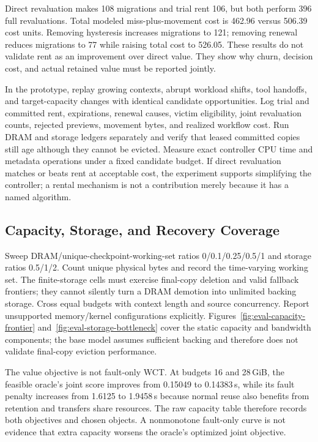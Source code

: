 \documentclass[sigplan,10pt,anonymous,nonacm]{acmart}
\begin{document}
Direct revaluation makes 108 migrations and trial rent 106, but both
perform 396 full revaluations. Total modeled miss-plus-movement cost
is 462.96 versus 506.39 cost units. Removing hysteresis increases
migrations to 121; removing renewal reduces migrations to 77 while
raising total cost to 526.05. These results do not validate rent as an
improvement over direct value. They show why churn, decision cost, and
actual retained value must be reported jointly.

In the prototype, replay growing contexts, abrupt workload shifts, tool
handoffs, and target-capacity changes with identical candidate opportunities.
Log trial and committed rent, expirations, renewal causes, victim eligibility,
joint revaluation counts, rejected previews, movement bytes, and realized
workflow cost. Run DRAM and storage ledgers separately and verify that
leased committed copies still age although they cannot be evicted.
Measure exact controller CPU time and metadata operations under a fixed
candidate budget. If direct revaluation matches or beats rent at acceptable
cost, the experiment supports simplifying the controller; a rental
mechanism is not a contribution merely because it has a named algorithm.

\FloatBarrier
\subsection{Capacity, Storage, and Recovery Coverage}

Sweep DRAM/unique-checkpoint-working-set ratios 0/0.1/0.25/0.5/1 and
storage ratios 0.5/1/2. Count unique physical bytes and record the
time-varying working set. The finite-storage cells must exercise final-copy
deletion and valid fallback frontiers; they cannot silently turn a DRAM
demotion into unlimited backing storage. Cross equal budgets with
context length and source concurrency. Report unsupported memory/kernel
configurations explicitly. Figures~\ref{fig:eval-capacity-frontier}
and~\ref{fig:eval-storage-bottleneck} cover the static capacity and
bandwidth components; the base model assumes sufficient backing and
therefore does not validate final-copy eviction performance.

The value objective is not fault-only WCT. At budgets 16 and 28\,GiB,
the feasible oracle's joint score improves from 0.15049 to 0.14383\,s,
while its fault penalty increases from 1.6125 to 1.9458\,s because
normal reuse also benefits from retention and transfers share resources.
The raw capacity table therefore records both objectives and chosen
objects. A nonmonotone fault-only curve is not evidence that extra
capacity worsens the oracle's optimized joint objective.
\end{document}
